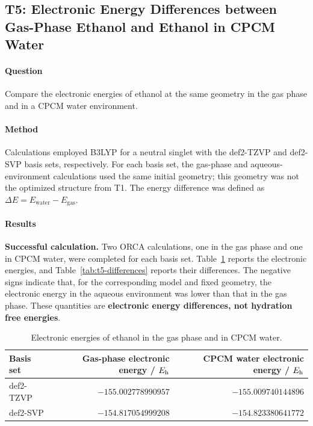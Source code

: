 \subsection{T5: Electronic Energy Differences between Gas-Phase Ethanol and Ethanol in CPCM Water}
\paragraph{Question}
Compare the electronic energies of ethanol at the same geometry in the gas phase and in a CPCM water environment.

\paragraph{Method}
Calculations employed B3LYP for a neutral singlet with the def2-TZVP and def2-SVP basis sets, respectively.
For each basis set, the gas-phase and aqueous-environment calculations used the same initial geometry; this geometry was not the optimized structure from T1.
The energy difference was defined as $\Delta E=E_{\mathrm{water}}-E_{\mathrm{gas}}$.

\paragraph{Results}
\textbf{Successful calculation.} Two ORCA calculations, one in the gas phase and one in CPCM water, were completed for each basis set.
Table~\ref{tab:t5-energies} reports the electronic energies, and Table~\ref{tab:t5-differences} reports their differences.
The negative signs indicate that, for the corresponding model and fixed geometry, the electronic energy in the aqueous environment was lower than that in the gas phase.
These quantities are \textbf{electronic energy differences, not hydration free energies}.

\begin{table}[H]
  \centering\small
  \caption{Electronic energies of ethanol in the gas phase and in CPCM water.}
  \label{tab:t5-energies}
  \begin{tabular}{lrr}
    \toprule
    Basis set & Gas-phase electronic energy / $E_{\mathrm h}$ & CPCM water electronic energy / $E_{\mathrm h}$\\
    \midrule
    def2-TZVP & $-155.002778990957$ & $-155.009740144896$\\
    def2-SVP & $-154.817054999208$ & $-154.823380641772$\\
    \bottomrule
  \end{tabular}
\end{table}

